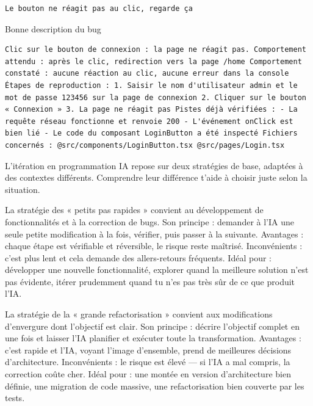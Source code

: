 \begin{lstlisting}
Le bouton ne réagit pas au clic, regarde ça
\end{lstlisting}

Bonne description du bug

\begin{lstlisting}
Clic sur le bouton de connexion : la page ne réagit pas. Comportement attendu : après le clic, redirection vers la page /home Comportement constaté : aucune réaction au clic, aucune erreur dans la console Étapes de reproduction : 1. Saisir le nom d'utilisateur admin et le mot de passe 123456 sur la page de connexion 2. Cliquer sur le bouton « Connexion » 3. La page ne réagit pas Pistes déjà vérifiées : - La requête réseau fonctionne et renvoie 200 - L'événement onClick est bien lié - Le code du composant LoginButton a été inspecté Fichiers concernés : @src/components/LoginButton.tsx @src/pages/Login.tsx
\end{lstlisting}


L'itération en programmation IA repose sur deux stratégies de base, adaptées à des contextes différents. Comprendre leur différence t'aide à choisir juste selon la situation.

La stratégie des « petits pas rapides » convient au développement de fonctionnalités et à la correction de bugs. Son principe : demander à l'IA une seule petite modification à la fois, vérifier, puis passer à la suivante. Avantages : chaque étape est vérifiable et réversible, le risque reste maîtrisé. Inconvénients : c'est plus lent et cela demande des allers-retours fréquents. Idéal pour : développer une nouvelle fonctionnalité, explorer quand la meilleure solution n'est pas évidente, itérer prudemment quand tu n'es pas très sûr de ce que produit l'IA.

La stratégie de la « grande refactorisation » convient aux modifications d'envergure dont l'objectif est clair. Son principe : décrire l'objectif complet en une fois et laisser l'IA planifier et exécuter toute la transformation. Avantages : c'est rapide et l'IA, voyant l'image d'ensemble, prend de meilleures décisions d'architecture. Inconvénients : le risque est élevé — si l'IA a mal compris, la correction coûte cher. Idéal pour : une montée en version d'architecture bien définie, une migration de code massive, une refactorisation bien couverte par les tests.

